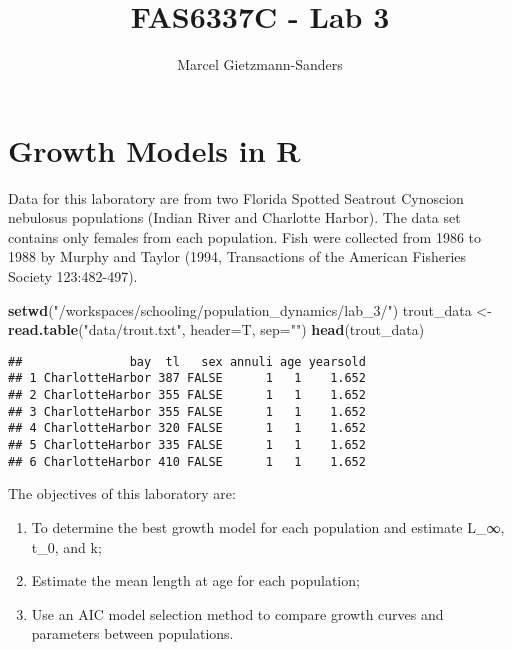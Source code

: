 \documentclass[
]{article}
\title{FAS6337C - Lab 3}
\author{Marcel Gietzmann-Sanders}
\date{}
\newenvironment{Shaded}{\begin{snugshade}}{\end{snugshade}}
\newcommand{\DataTypeTok}[1]{\textcolor[rgb]{0.13,0.29,0.53}{#1}}
\newcommand{\KeywordTok}[1]{\textcolor[rgb]{0.13,0.29,0.53}{\textbf{#1}}}
\newcommand{\NormalTok}[1]{#1}
\newcommand{\StringTok}[1]{\textcolor[rgb]{0.31,0.60,0.02}{#1}}
\providecommand{\tightlist}{%
  \setlength{\itemsep}{0pt}\setlength{\parskip}{0pt}}
\begin{document}
\maketitle

\hypertarget{growth-models-in-r}{%
\section{Growth Models in R}\label{growth-models-in-r}}

Data for this laboratory are from two Florida Spotted Seatrout Cynoscion
nebulosus populations (Indian River and Charlotte Harbor). The data set
contains only females from each population. Fish were collected from
1986 to 1988 by Murphy and Taylor (1994, Transactions of the American
Fisheries Society 123:482-497).

\begin{Shaded}
\begin{Highlighting}[]
\KeywordTok{setwd}\NormalTok{(}\StringTok{"/workspaces/schooling/population\_dynamics/lab\_3/"}\NormalTok{)}
\NormalTok{trout\_data \textless{}{-}}\StringTok{ }\KeywordTok{read.table}\NormalTok{(}\StringTok{"data/trout.txt"}\NormalTok{, }\DataTypeTok{header=}\NormalTok{T, }\DataTypeTok{sep=}\StringTok{""}\NormalTok{) }
\KeywordTok{head}\NormalTok{(trout\_data)}
\end{Highlighting}
\end{Shaded}

\begin{verbatim}
##               bay  tl   sex annuli age yearsold
## 1 CharlotteHarbor 387 FALSE      1   1    1.652
## 2 CharlotteHarbor 355 FALSE      1   1    1.652
## 3 CharlotteHarbor 355 FALSE      1   1    1.652
## 4 CharlotteHarbor 320 FALSE      1   1    1.652
## 5 CharlotteHarbor 335 FALSE      1   1    1.652
## 6 CharlotteHarbor 410 FALSE      1   1    1.652
\end{verbatim}

The objectives of this laboratory are:

\begin{enumerate}
\def\labelenumi{\arabic{enumi}.}
\tightlist
\item
  To determine the best growth model for each population and estimate
  L\_∞, t\_0, and k;
\item
  Estimate the mean length at age for each population;
\item
  Use an AIC model selection method to compare growth curves and
  parameters between populations.
\end{enumerate}
\end{document}
